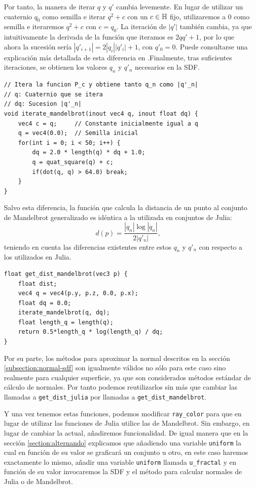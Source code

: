 Por tanto, la manera de iterar $q$ y $q'$ cambia levemente. En lugar de utilizar un cuaternio $q_0$ como semilla e iterar $q^2+c$ con un $c\in\mathbb{H}$ fijo, utilizaremos a $0$ como semilla e iteraremos $q^2+c$ con $c=q_0$. La iteración de $|q'|$ también cambia, ya que intuitivamente la derivada de la función que iteramos es $2qq'+1$, por lo que ahora la sucesión sería $|q'_{i+1}|=2|q_i||q'_i|+1$, con $q'_0=0$. Puede consultarse una explicación más detallada de esta diferencia en \cite{distance-fractals}.Finalmente, tras suficientes iteraciones, se obtienen los valores $q_n$ y $q'_n$ necesarios en la SDF.

\begin{lstlisting}
// Itera la funcion P_c y obtiene tanto q_n como |q'_n|
// q: Cuaternio que se itera
// dq: Sucesion |q'_n|
void iterate_mandelbrot(inout vec4 q, inout float dq) {
    vec4 c = q;     // Constante inicialmente igual a q
    q = vec4(0.0);  // Semilla inicial
    for(int i = 0; i < 50; i++) {
        dq = 2.0 * length(q) * dq + 1.0;
        q = quat_square(q) + c;
        if(dot(q, q) > 64.0) break;
    }
}
\end{lstlisting}

Salvo esta diferencia, la función que calcula la distancia de un punto al conjunto de Mandelbrot generalizado es idéntica a la utilizada en conjuntos de Julia: 
$$
d(p)=\dfrac{|q_n|\log|q_n|}{2|q'_n|},
$$
teniendo en cuenta las diferencias existentes entre estos $q_n$ y $q'_n$ con respecto a los utilizados en Julia.

\begin{lstlisting}
float get_dist_mandelbrot(vec3 p) {
    float dist;
    vec4 q = vec4(p.y, p.z, 0.0, p.x);
    float dq = 0.0;
    iterate_mandelbrot(q, dq);
    float length_q = length(q);
    return 0.5*length_q * log(length_q) / dq;
}
\end{lstlisting}

Por su parte, los métodos para aproximar la normal descritos en la sección \ref{subsection:normal-sdf} son igualmente válidos no sólo para este caso sino realmente para cualquier superficie, ya que son considerados métodos estándar de cálculo de normales. Por tanto podemos reutilizarlos sin más que cambiar las llamadas a \verb|get_dist_julia| por llamadas a \verb|get_dist_mandelbrot|. 

Y una vez tenemos estas funciones, podemos modificar \verb|ray_color| para que en lugar de utilizar las funciones de Julia utilice las de Mandelbrot. Sin embargo, en lugar de cambiar la actual, añadiremos funcionalidad. De igual manera que en la sección \ref{section:alternando} explicamos que añadiendo una variable \verb|uniform| la cual en función de su valor se graficará un conjunto u otro, en este caso haremos exactamente lo mismo, añadir una variable \verb|uniform| llamada \verb|u_fractal| y en función de su valor invocaremos la SDF y el método para calcular normales de Julia o de Mandelbrot.

